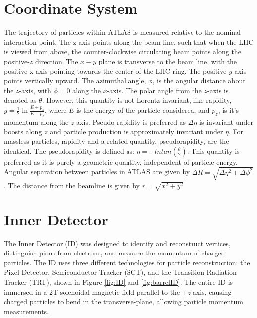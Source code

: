 \section{Coordinate System}
The trajectory of particles within ATLAS is measured relative to the nominal interaction point. The z-axis points along the beam line, such that when the LHC is viewed from above, the counter-clockwise circulating beam points along the positive-$z$ direction. The $x-y$ plane is transverse to the beam line, with the positive x-axis pointing towards the center of the LHC ring. The positive $y$-axis points vertically upward. The azimuthal angle, $\phi$, is the angular distance about the $z$-axis, with $\phi=0$ along the $x$-axis. The polar angle from the $z$-axis is denoted as $\theta$.  However, this quantity is not Lorentz invariant, like rapidity, $y=\frac{1}{2}\ln\frac{E+p_{z}}{E-p_{z}}$, where $E$ is the energy of the particle considered, and $p_{z}$, is it's momentum along the $z$-axis. Pseudo-rapidity is preferred as $\Delta \eta$ is invariant under boosts along $z$ and particle production is approximately invariant under $\eta$. For massless particles, rapidity and a related quantity, pseudorapidity, are the identical. The pseudorapidity is defined as: $\eta = -ln tan(\frac{\theta}{2})$.  This quantity is preferred as it is purely a geometric quantity, independent of particle energy. Angular separation between particles in ATLAS are given by $\Delta R = \sqrt{\Delta \eta^{2}+\Delta \phi^{2}}$. The distance from the beamline is given by $r=\sqrt{x^{2}+y^{2}}$
 
\section{Inner Detector}
The Inner Detector (ID) was designed to identify and reconstruct vertices, distinguish pions from electrons, and measure the momentum of charged particles. The ID uses three different technologies for particle reconstruction: the Pixel Detector, Semiconductor Tracker (SCT), and the Transition Radiation Tracker (TRT), shown in Figure \ref{fig:ID} and \ref{fig:barrelID}. The entire ID is immersed in a 2T solenoidal magnetic field parallel to the $+z$-axis, causing charged particles to bend in the transverse-plane, allowing particle momentum measurements. 

